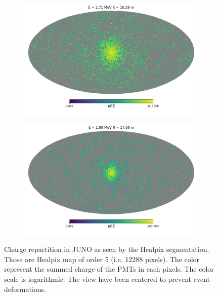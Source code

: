 \documentclass[../main.tex]{subfiles}
\begin{document}
\begin{figure}
  \begin{subfigure}[t]{0.48\linewidth}
    \includegraphics[width=\linewidth]{images/jgnn/harmonic/event_idx_750.png}
    \caption{}
  \end{subfigure}
  \hfill
  \begin{subfigure}[t]{0.48\linewidth}
    \includegraphics[width=\linewidth]{images/jgnn/harmonic/event_idx_999.png}
    \caption{}
  \end{subfigure}

  \caption{Charge repartition in JUNO as seen by the Healpix segmentation. Those are Healpix map of order 5 (i.e. 12288 pixels). The color represent the summed charge of the PMTs in each pixels. The color scale is logarithmic. The view have been centered to prevent event deformations.}
  \label{fig:annex:jgnn:harmonic:events}
\end{figure}
\end{document}
